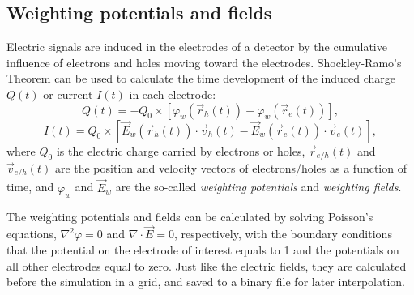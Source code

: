 \documentclass[epj]{svjour}
\begin{document}
\subsection{Weighting potentials and fields}
\label{s:wei}
Electric signals are induced in the electrodes of a detector by the
cumulative influence of electrons and holes moving toward the
electrodes. Shockley-Ramo's Theorem \cite{Gat82,Rad88,He00} can be
used to calculate the time development of the induced charge $Q(t)$ or
current $I(t)$ in each electrode:
\begin{equation} 
\label{e:ramoq}
Q(t) = -Q_{0} \times [\varphi_{w}(\vec{r}_{h}(t)) -
\varphi_{w}(\vec{r}_{e}(t))],
\end{equation}
\begin{equation} 
\label{e:ramoi}
I(t) = Q_{0} \times [\vec{E}_{w}(\vec{r}_{h}(t)) \cdot 
\vec{v}_{h}(t) - \vec{E}_{w}(\vec{r}_{e}(t)) \cdot 
\vec{v}_{e}(t)],
\end{equation}
where $Q_{0}$ is the electric charge carried by electrons or holes,
$\vec{r}_{e/h}(t)$ and $\vec{v}_{e/h}(t)$ are the position and
velocity vectors of electrons/holes as a function of time, and
$\varphi_{w}$ and $\vec{E}_{w}$ are the so-called \emph{weighting
potentials} and \emph{weighting fields}. 

The weighting potentials and fields can be calculated by solving
Poisson's equations, $\nabla^{2} \varphi = 0$ and $\nabla \cdot
\vec{E} = 0$, respectively, with the boundary conditions that the
potential on the electrode of interest equals to 1 and the potentials
on all other electrodes equal to zero. Just like the electric fields,
they are calculated before the simulation in a grid, and saved to a
binary file for later interpolation.
\end{document}
